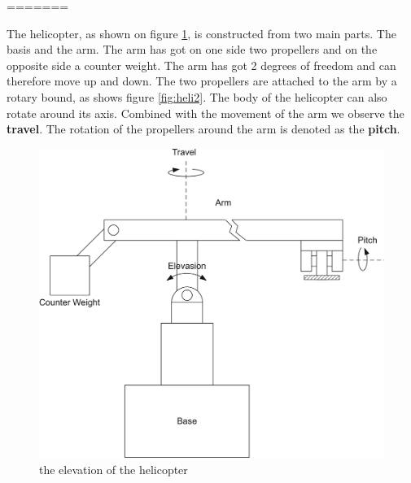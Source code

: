 =======
\graphicspath{ {figures/} }
The helicopter, as shown on figure \ref{fig:heli1}, is constructed from two main parts. The basis and the arm. The arm has got on one side two propellers and on the opposite side a counter weight. The arm has got 2 degrees of freedom and can therefore move up and down. The two propellers are attached to the arm by a rotary bound, as shows figure \ref{fig:heli2}. 
The body of the helicopter can also rotate around its axis. Combined with the movement of the arm we observe the \textbf{travel}. The rotation of the propellers around the arm is denoted as the \textbf{pitch}. 	
\begin{figure}[h]
\includegraphics[width=\textwidth]{HeliScatch1.png}
\caption{the elevation of the helicopter}
\label{fig:heli1}
\end{figure} 

